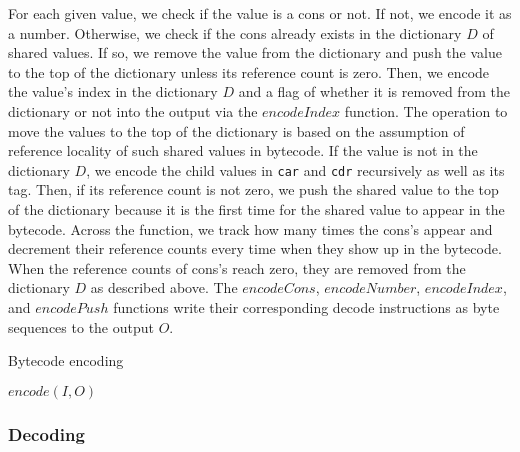\documentclass[sigplan, anonymous, review]{acmart}
\begin{document}
For each given value, we check if the value is a cons or not.
If not, we encode it as a number.
Otherwise, we check if the cons already exists in the dictionary $D$ of
shared values.
If so, we remove the value from the dictionary and push the value to
the top of the dictionary unless its reference count is zero.
Then, we encode the value's index in the dictionary $D$ and a flag of whether it
is removed from the dictionary or not into the output via the
$encodeIndex$ function.
The operation to move the values to the top of the dictionary is based on the
assumption of reference locality of such shared values in bytecode.
If the value is not in the dictionary $D$, we encode the child values in
\texttt{car} and \texttt{cdr} recursively as well as its tag.
Then, if its reference count is not zero, we push the shared value to
the top of the dictionary because it is the first time for the shared value
to appear in the bytecode.
Across the function, we track how many times the cons's appear and
decrement their reference counts every time when they show up in the bytecode.
When the reference counts of cons's reach zero, they are removed from the
dictionary $D$ as described above.
The $encodeCons$, $encodeNumber$, $encodeIndex$, and $encodePush$
functions write their corresponding decode instructions as byte
sequences to the output $O$.

\begin{algorithm}
  \caption{Bytecode encoding}
  \label{algorithm:encode}



  $encode(I, O)$ \;
\end{algorithm}

\subsubsection{Decoding} \label{decoding}
\end{document}
